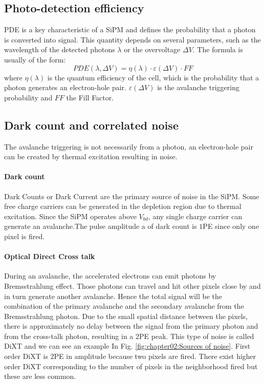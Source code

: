 \subsection{Photo-detection efficiency }
\label{subsection:PDE}
PDE is a key characteristic of a SiPM and defines the probability that a photon is converted into signal. This quantity depends on several parameters, such as the wavelength of the detected photons $\lambda$ or the overvoltage $\Delta V$. The formula is usually of the form:
\begin{equation}
      PDE(\lambda, \Delta V)= \eta(\lambda)\cdot \varepsilon(\Delta V)\cdot FF  
    \label{eq:pde theory}
\end{equation}
where $\eta(\lambda)$ is the quantum efficiency of the cell, which is the probability that a photon generates an electron-hole pair.   $\varepsilon(\Delta V)$ is the avalanche triggering probability and $FF$ the Fill Factor. 

\subsection{Dark count and correlated noise}
\label{subsec:Correlated noise}
The avalanche triggering is not necessarily from a photon, an electron-hole pair can be created by thermal excitation resulting in noise. 
\paragraph{Dark count} Dark Counts or Dark Current are the primary source of noise in the SiPM. Some free charge carriers can be generated in the depletion region due to thermal excitation. Since the SiPM operates above $V_{bd}$, any single charge carrier can generate an avalanche.The pulse amplitude a of dark count is $1$\ac{PE} since only one pixel is fired. 

\paragraph{Optical Direct Cross talk} During an  avalanche, the accelerated electrons can emit photons by Bremsstrahlung effect. Those photons can travel and hit other pixels close by and in turn generate another avalanche. Hence the total signal will be the combination of the primary avalanche and the secondary avalanche from the Bremsstrahlung photon. Due to the small spatial distance between the pixels, there is approximately no delay between the signal from the primary photon and from the cross-talk photon, resulting in a 2PE peak. This type of noise is called \ac{DiXT} and we can see an example In Fig. \ref{fig:chapter02:Sources of noise}. First order DiXT is $2$PE in amplitude because two pixels are fired. There exist higher order DiXT corresponding to the number of pixels in the neighborhood fired but these are less common. 

